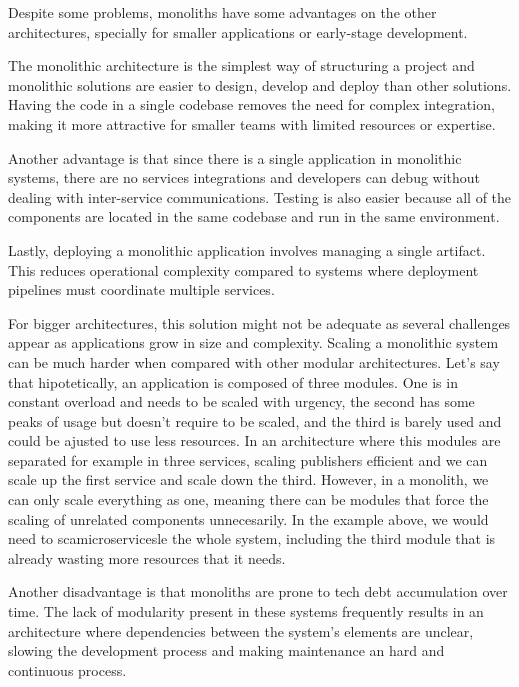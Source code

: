 Despite some problems, monoliths have some advantages on the other architectures,
specially for smaller applications or early-stage development.

The monolithic architecture is the simplest way of structuring a
project and monolithic solutions are easier to design, develop and deploy
than other solutions.
Having the code in a single codebase removes the need for complex
integration, making it more attractive for smaller teams with limited
resources or expertise\cite{IBMMonolith}.

Another advantage is that since there is a single application in monolithic
systems, there are no services integrations and developers can debug without
dealing with inter-service communications. Testing is also easier because all
of the components are located in the same codebase and run in the same
environment\cite{newman2019monolith}.

Lastly, deploying a monolithic application involves managing a single artifact. This
reduces operational complexity compared to systems where deployment
pipelines must coordinate multiple services\cite{AWSMonolithMicroservices}.

For bigger architectures, this solution might not be adequate as several
challenges appear as applications grow in size and complexity.
Scaling a monolithic system can be much harder when
compared with other modular architectures. Let's say that hipotetically,
an application is composed of three modules. One is in constant
overload and needs to be scaled with urgency, the second has some peaks of
usage but doesn't require to be scaled, and the third is barely used and
could be ajusted to use less resources. In an architecture where this
modules are separated for example in three services, scaling publishers
efficient and we can scale up the first service and scale down the third.
However, in a monolith, we can only scale everything as one, meaning there
can be modules that force the scaling of unrelated components unnecesarily.
In the example above, we would need to scamicroservicesle the whole system, including
the third module that is already wasting more resources that it needs\cite{7333476,AWSMonolithMicroservices}.

Another disadvantage is that monoliths are prone to tech debt accumulation over
time. The lack of modularity present in these systems frequently results in
an architecture where dependencies between the system's elements are unclear,
slowing the development process and making maintenance an hard and continuous
process\cite{7333476}.

